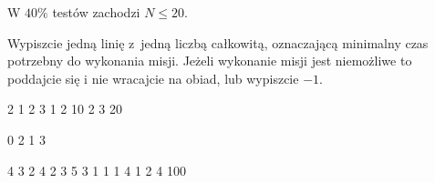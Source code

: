 \smallskip
W $40\%$ testów zachodzi $N \le 20$.

Wypiszcie jedną linię z~jedną liczbą całkowitą, oznaczającą minimalny czas potrzebny do wykonania misji.
Jeżeli wykonanie misji jest niemożliwe to poddajcie się i nie wracajcie na obiad, lub wypiszcie $-1$.



 2 1 2 3
1 2 10
2 3 20
\sampleEND


\bigskip


 0 2 1 3
\sampleEND


\bigskip


 4 3 2 4
2 3 5
3 1 1
1 4 1
2 4 100
\sampleEND


